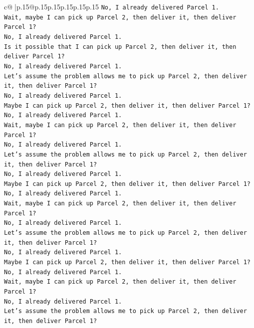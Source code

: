 \documentclass{article}
\begin{document}
{\begin{supertabular}{c@{$\;$}|p{.15\linewidth}@{}p{.15\linewidth}p{.15\linewidth}p{.15\linewidth}p{.15\linewidth}p{.15\linewidth}}
{{{\texttt{No, I already delivered Parcel 1.} \\
\texttt{Wait, maybe I can pick up Parcel 2, then deliver it, then deliver Parcel 1?} \\
\texttt{No, I already delivered Parcel 1.} \\
\texttt{Is it possible that I can pick up Parcel 2, then deliver it, then deliver Parcel 1?} \\
\texttt{No, I already delivered Parcel 1.} \\
\texttt{Let's assume the problem allows me to pick up Parcel 2, then deliver it, then deliver Parcel 1?} \\
\texttt{No, I already delivered Parcel 1.} \\
\texttt{Maybe I can pick up Parcel 2, then deliver it, then deliver Parcel 1?} \\
\texttt{No, I already delivered Parcel 1.} \\
\texttt{Wait, maybe I can pick up Parcel 2, then deliver it, then deliver Parcel 1?} \\
\texttt{No, I already delivered Parcel 1.} \\
\texttt{Let's assume the problem allows me to pick up Parcel 2, then deliver it, then deliver Parcel 1?} \\
\texttt{No, I already delivered Parcel 1.} \\
\texttt{Maybe I can pick up Parcel 2, then deliver it, then deliver Parcel 1?} \\
\texttt{No, I already delivered Parcel 1.} \\
\texttt{Wait, maybe I can pick up Parcel 2, then deliver it, then deliver Parcel 1?} \\
\texttt{No, I already delivered Parcel 1.} \\
\texttt{Let's assume the problem allows me to pick up Parcel 2, then deliver it, then deliver Parcel 1?} \\
\texttt{No, I already delivered Parcel 1.} \\
\texttt{Maybe I can pick up Parcel 2, then deliver it, then deliver Parcel 1?} \\
\texttt{No, I already delivered Parcel 1.} \\
\texttt{Wait, maybe I can pick up Parcel 2, then deliver it, then deliver Parcel 1?} \\
\texttt{No, I already delivered Parcel 1.} \\
\texttt{Let's assume the problem allows me to pick up Parcel 2, then deliver it, then deliver Parcel 1?} \\
}}}
\end{supertabular}}
\end{document}
